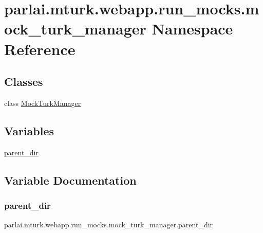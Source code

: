 \hypertarget{namespaceparlai_1_1mturk_1_1webapp_1_1run__mocks_1_1mock__turk__manager}{}\section{parlai.\+mturk.\+webapp.\+run\+\_\+mocks.\+mock\+\_\+turk\+\_\+manager Namespace Reference}
\label{namespaceparlai_1_1mturk_1_1webapp_1_1run__mocks_1_1mock__turk__manager}
\subsection*{Classes}
\begin{DoxyCompactItemize}
\item 
class \hyperlink{classparlai_1_1mturk_1_1webapp_1_1run__mocks_1_1mock__turk__manager_1_1MockTurkManager}{Mock\+Turk\+Manager}
\end{DoxyCompactItemize}
\subsection*{Variables}
\begin{DoxyCompactItemize}
\item 
\hyperlink{namespaceparlai_1_1mturk_1_1webapp_1_1run__mocks_1_1mock__turk__manager_aaf28d6781beba2d4dea213d393ae71bb}{parent\+\_\+dir}
\end{DoxyCompactItemize}


\subsection{Variable Documentation}
\mbox{\label{namespaceparlai_1_1mturk_1_1webapp_1_1run__mocks_1_1mock__turk__manager_aaf28d6781beba2d4dea213d393ae71bb}} 
\subsubsection{\texorpdfstring{parent\+\_\+dir}{parent\_dir}}
{\footnotesize\ttfamily parlai.\+mturk.\+webapp.\+run\+\_\+mocks.\+mock\+\_\+turk\+\_\+manager.\+parent\+\_\+dir}

